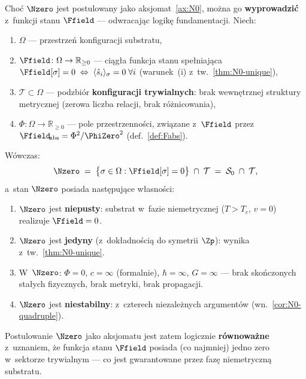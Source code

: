 \begin{proposition}\label{prop:N0-from-F}
Cho\'c $\Nzero$ jest postulowany jako aksjomat~\ref{ax:N0},
mo\.zna go \textbf{wyprowadzi\'c} z~funkcji stanu $\Ffield$ ---
odwracaj\k{a}c logik\k{e} fundamentacji. Niech:
\begin{enumerate}[nosep]
  \item[(F1)] $\Omega$ --- przestrze\'n konfiguracji substratu,
  \item[(F2)] $\Ffield\colon\Omega\to\mathbb{R}_{\ge 0}$ --- ci\k{a}g\l{}a
    funkcja stanu spe\l{}niaj\k{a}ca $\Ffield[\sigma] = 0
    \;\Leftrightarrow\; \langle\hat{s}_i\rangle_\sigma = 0\;\forall i$
    (warunek~(i) z~tw.~\ref{thm:N0-unique}),
  \item[(F3)] $\mathcal{T}\subset\Omega$ --- podzbi\'or
    \textbf{konfiguracji trywialnych}: brak wewn\k{e}trznej struktury
    metrycznej (zerowa liczba relacji, brak r\'o\.znicowania),
  \item[(F4)] $\Phi\colon\Omega\to\mathbb{R}_{\ge 0}$ --- pole
    przestrzenno\'sci, zwi\k{a}zane z~$\Ffield$ przez
    $\Ffield_{\!\mathrm{abs}} = \Phi^2/\PhiZero^2$
    (def.~\ref{def:Fabs}).
\end{enumerate}
W\'owczas:
\begin{equation}\label{eq:N0-derived}
    \Nzero \;=\; \bigl\{\sigma \in \Omega :
        \Ffield[\sigma] = 0\bigr\} \;\cap\; \mathcal{T}
    \;=\; \mathcal{S}_0 \;\cap\; \mathcal{T},
\end{equation}
a~stan $\Nzero$ posiada nast\k{e}puj\k{a}ce w\l{}asno\'sci:
\begin{enumerate}
  \item $\Nzero$ jest \textbf{niepusty}: substrat w~fazie
    niemetrycznej ($T > T_c$, $v = 0$) realizuje $\Ffield = 0$.
  \item $\Nzero$ jest \textbf{jedyny} (z~dok\l{}adno\'sci\k{a} do
    symetrii $\Zp$): wynika z~tw.~\ref{thm:N0-unique}.
  \item W~$\Nzero$: $\Phi = 0$, $c = \infty$ (formalnie),
    $\hbar = \infty$, $G = \infty$ --- brak sko\'nczonych sta\l{}ych
    fizycznych, brak metryki, brak propagacji.
  \item $\Nzero$ jest \textbf{niestabilny}: z~czterech niezale\.znych
    argument\'ow (wn.~\ref{cor:N0-quadruple}).
\end{enumerate}
Postulowanie $\Nzero$ jako aksjomatu jest zatem logicznie
\textbf{r\'ownowa\.zne} z~uznaniem, \.ze funkcja stanu $\Ffield$
posiada (co najmniej) jedno zero w~sektorze trywialnym ---
co jest gwarantowane przez faz\k{e} niemetryczn\k{a} substratu.
\end{proposition}


